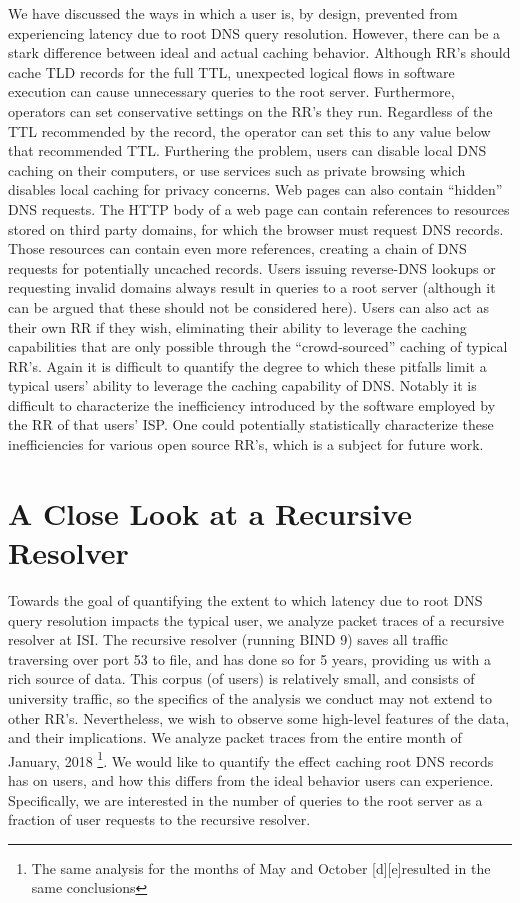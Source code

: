 \documentclass[sigconf,nonacm,10pt]{acmart}
\begin{document}
We have discussed the ways in which a user is, by design, prevented from
experiencing latency due to root DNS query resolution. However, there
can be a stark difference between ideal and actual caching behavior.
Although RR's should cache TLD records for the full TTL, unexpected
logical flows in software execution can cause unnecessary queries to the
root server. Furthermore, operators can set conservative settings on the
RR's they run. Regardless of the TTL recommended by the record, the
operator can set this to any value below that recommended TTL.
Furthering the problem, users can disable local DNS caching on their
computers, or use services such as private browsing which disables local
caching for privacy concerns. Web pages can also contain ``hidden'' DNS
requests. The HTTP body of a web page can contain references to
resources stored on third party domains, for which the browser must
request DNS records. Those resources can contain even more references,
creating a chain of DNS requests for potentially uncached records. Users
issuing reverse-DNS lookups or requesting invalid domains always result
in queries to a root server (although it can be argued that these should
not be considered here). Users can also act as their own RR if they
wish, eliminating their ability to leverage the caching capabilities
that are only possible through the ``crowd-sourced'' caching of typical
RR's. Again it is difficult to quantify the degree to which these
pitfalls limit a typical users' ability to leverage the caching
capability of DNS. Notably it is difficult to characterize the
inefficiency introduced by the software employed by the RR of that
users' ISP. One could potentially statistically characterize these
inefficiencies for various open source RR's, which is a subject for
future work.

\section{A Close Look at a Recursive
Resolver}\label{a-close-look-at-a-recursive-resolver-1}

Towards the goal of quantifying the extent to which latency due to root
DNS query resolution impacts the typical user, we analyze packet traces
of a recursive resolver at ISI. The recursive resolver (running BIND 9)
saves all traffic traversing over port 53 to file, and has done so for 5
years, providing us with a rich source of data. This corpus (of users)
is relatively small, and consists of university traffic, so the
specifics of the analysis we conduct may not extend to other RR's.
Nevertheless, we wish to observe some high-level features of the data,
and their implications. We analyze packet traces from the entire month
of January, 2018
\footnote{ The same analysis for the months of May and October [d][e]resulted in the same conclusions }.
We would like to quantify the effect caching root DNS records has on
users, and how this differs from the ideal behavior users can
experience. Specifically, we are interested in the number of queries to
the root server as a fraction of user requests to the recursive
resolver.
\end{document}
